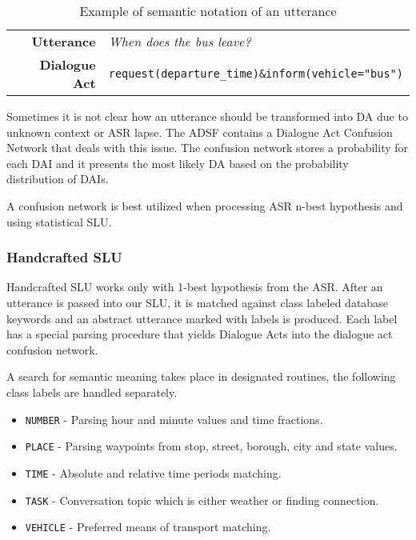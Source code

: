 \begin{table}[h]
\centering
\begin{tabular}{ r | l }
	\textbf{Utterance} & \textit{When does the bus leave?} \\
	\textbf{Dialogue Act} & \texttt{request(departure\_time)\&inform(vehicle="bus")}
\end{tabular}
\caption{Example of semantic notation of an utterance}
\label{table:utterance}
\end{table}

Sometimes it is not clear how an utterance should be transformed into DA due to unknown context or ASR lapse.
The ADSF contains a Dialogue Act Confusion Network that deals with this issue. %
The confusion network stores a probability for each DAI and it presents the most likely DA based on the probability distribution of DAIs.

A confusion network is best utilized when processing ASR n-best hypothesis and using statistical SLU.

\subsubsection{Handcrafted SLU}

Handcrafted SLU works only with 1-best hypothesis from the ASR.
After an utterance is passed into our SLU, it is matched against class labeled database keywords and an abstract utterance marked with labels is produced.
Each label has a special parsing procedure that yields Dialogue Acts into the dialogue act confusion network.

A search for semantic meaning takes place in designated routines, the following class labels are handled separately.

\begin{itemize}
	\item \texttt{NUMBER} - Parsing hour and minute values and time fractions.
	\item \texttt{PLACE} - Parsing waypoints from stop, street, borough, city and state values.
	\item \texttt{TIME} - Absolute and relative time periods matching.
	\item \texttt{TASK} - Conversation topic  which is either weather or finding connection.
	\item \texttt{VEHICLE} - Preferred means of transport matching.
\end{itemize}

